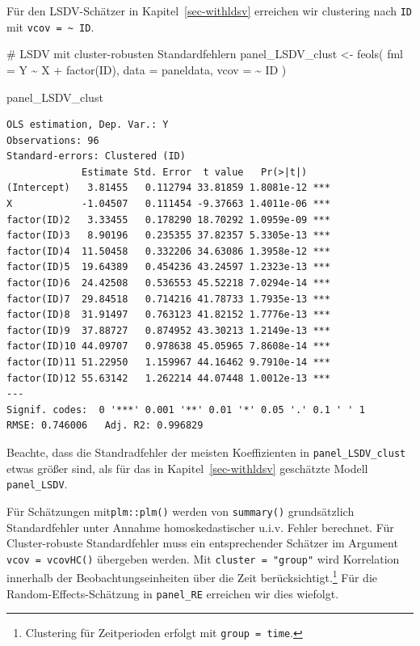 \documentclass[
  a4paper,
  DIV=11,
  oneside]{scrreprt}
\newenvironment{Shaded}{\begin{snugshade}}{\end{snugshade}}
\newcommand{\AttributeTok}[1]{\textcolor[rgb]{0.40,0.45,0.13}{#1}}
\newcommand{\CommentTok}[1]{\textcolor[rgb]{0.37,0.37,0.37}{#1}}
\newcommand{\FunctionTok}[1]{\textcolor[rgb]{0.28,0.35,0.67}{#1}}
\newcommand{\NormalTok}[1]{\textcolor[rgb]{0.00,0.23,0.31}{#1}}
\newcommand{\OtherTok}[1]{\textcolor[rgb]{0.00,0.23,0.31}{#1}}
\newcommand{\SpecialCharTok}[1]{\textcolor[rgb]{0.37,0.37,0.37}{#1}}
\begin{document}
Für den LSDV-Schätzer in Kapitel~\ref{sec-withldsv} erreichen wir
clustering nach \texttt{ID} mit \texttt{vcov\ =\ \textasciitilde{}\ ID}.

\begin{Shaded}
\begin{Highlighting}[]
\CommentTok{\# LSDV mit cluster{-}robusten Standardfehlern}
\NormalTok{panel\_LSDV\_clust }\OtherTok{\textless{}{-}} \FunctionTok{feols}\NormalTok{(}
  \AttributeTok{fml =}\NormalTok{ Y }\SpecialCharTok{\textasciitilde{}}\NormalTok{ X }\SpecialCharTok{+} \FunctionTok{factor}\NormalTok{(ID),  }
  \AttributeTok{data =}\NormalTok{ paneldata,}
  \AttributeTok{vcov =} \SpecialCharTok{\textasciitilde{}}\NormalTok{ ID}
\NormalTok{)}

\NormalTok{panel\_LSDV\_clust}
\end{Highlighting}
\end{Shaded}

\begin{verbatim}
OLS estimation, Dep. Var.: Y
Observations: 96
Standard-errors: Clustered (ID) 
             Estimate Std. Error  t value   Pr(>|t|)    
(Intercept)   3.81455   0.112794 33.81859 1.8081e-12 ***
X            -1.04507   0.111454 -9.37663 1.4011e-06 ***
factor(ID)2   3.33455   0.178290 18.70292 1.0959e-09 ***
factor(ID)3   8.90196   0.235355 37.82357 5.3305e-13 ***
factor(ID)4  11.50458   0.332206 34.63086 1.3958e-12 ***
factor(ID)5  19.64389   0.454236 43.24597 1.2323e-13 ***
factor(ID)6  24.42508   0.536553 45.52218 7.0294e-14 ***
factor(ID)7  29.84518   0.714216 41.78733 1.7935e-13 ***
factor(ID)8  31.91497   0.763123 41.82152 1.7776e-13 ***
factor(ID)9  37.88727   0.874952 43.30213 1.2149e-13 ***
factor(ID)10 44.09707   0.978638 45.05965 7.8608e-14 ***
factor(ID)11 51.22950   1.159967 44.16462 9.7910e-14 ***
factor(ID)12 55.63142   1.262214 44.07448 1.0012e-13 ***
---
Signif. codes:  0 '***' 0.001 '**' 0.01 '*' 0.05 '.' 0.1 ' ' 1
RMSE: 0.746006   Adj. R2: 0.996829
\end{verbatim}

Beachte, dass die Standradfehler der meisten Koeffizienten in
\texttt{panel\_LSDV\_clust} etwas größer sind, als für das in
Kapitel~\ref{sec-withldsv} geschätzte Modell \texttt{panel\_LSDV}.

Für Schätzungen mit\texttt{plm::plm()} werden von \texttt{summary()}
grundsätzlich Standardfehler unter Annahme homoskedastischer u.i.v.
Fehler berechnet. Für Cluster-robuste Standardfehler muss ein
entsprechender Schätzer im Argument \texttt{vcov\ =\ vcovHC()} übergeben
werden. Mit \texttt{cluster\ =\ "group"} wird Korrelation innerhalb der
Beobachtungseinheiten über die Zeit berücksichtigt.\footnote{Clustering
  für Zeitperioden erfolgt mit \texttt{group\ =\ time}.} Für die
Random-Effects-Schätzung in \texttt{panel\_RE} erreichen wir dies
wiefolgt.
\end{document}
